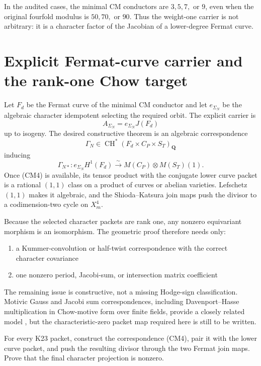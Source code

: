 \documentclass[11pt,oneside]{book}
\theoremstyle{definition}
\theoremstyle{remark}
\newcommand{\CH}{\operatorname{CH}}
\newcommand{\Q}{\mathbf{Q}}
\begin{document}
\begin{center}

\end{center}

In the audited cases, the minimal CM conductors are \(3,5,7,\) or \(9\), even when the original fourfold modulus is \(50,70,\) or \(90\). Thus the weight-one carrier is not arbitrary: it is a character factor of the Jacobian of a lower-degree Fermat curve.


\chapter{Explicit Fermat-curve carrier and the rank-one Chow target}
Let \(F_d\) be the Fermat curve of the minimal CM conductor and let \(e_{\Sigma_N}\) be the algebraic character idempotent selecting the required orbit. The explicit carrier is
\[
A_{\Sigma_N}=e_{\Sigma_N}J(F_d)
\]
up to isogeny. The desired constructive theorem is an algebraic correspondence
\[
\Gamma_N\in
\CH^\ast(F_d\times C_P\times S_T)_\Q
\]
inducing
\[
\boxed{
\Gamma_{N*}:
 e_{\Sigma_N}H^1(F_d)
 \xrightarrow{\sim}
 M(C_P)\otimes M(S_T)(1).
}
\tag{CM4}
\]
Once (CM4) is available, its tensor product with the conjugate lower curve packet is a rational \((1,1)\) class on a product of curves or abelian varieties. Lefschetz \((1,1)\) makes it algebraic, and the Shioda--Katsura join maps push the divisor to a codimension-two cycle on \(X_m^4\).

Because the selected character packets are rank one, any nonzero equivariant morphism is an isomorphism. The geometric proof therefore needs only:
\begin{enumerate}
\item a Kummer-convolution or half-twist correspondence with the correct character covariance
\item one nonzero period, Jacobi-sum, or intersection matrix coefficient
\end{enumerate}
The remaining issue is constructive, not a missing Hodge-sign classification. Motivic Gauss and Jacobi sum correspondences, including Davenport--Hasse multiplication in Chow-motive form over finite fields, provide a closely related model \cite{OtsuboYamazaki}, but the characteristic-zero packet map required here is still to be written.

\begin{openproblem}
For every K23 packet, construct the correspondence (CM4), pair it with the lower curve packet, and push the resulting divisor through the two Fermat join maps. Prove that the final character projection is nonzero.
\end{openproblem}
\end{document}
